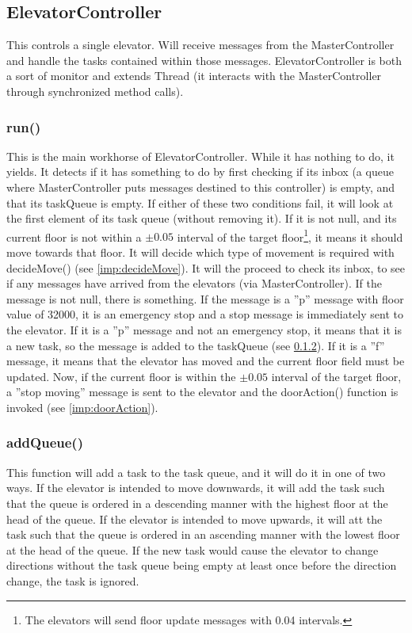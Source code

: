 \subsection{ElevatorController}
This controls a single elevator. Will receive messages from the MasterController and handle the tasks contained within those messages. ElevatorController is both a sort of monitor and extends Thread (it interacts with the MasterController through synchronized method calls).

\subsubsection{run()}
\label{imp:elerun}
This is the main workhorse of ElevatorController. While it has nothing to do, it yields. It detects if it has something to do by first checking if its inbox (a queue where MasterController puts messages destined to this controller) is empty, and that its taskQueue is empty.\newline
If either of these two conditions fail, it will look at the first element of its task queue (without removing it). If it is not null, and its current floor is not within a $\pm 0.05$ interval of the target floor\footnote{The elevators will send floor update messages with 0.04 intervals.}, it means it should move towards that floor. It will decide which type of movement is required with decideMove() (see \cref{imp:decideMove}). \newline
It will the proceed to check its inbox, to see if any messages have arrived from the elevators (via MasterController). If the message is not null, there is something. If the message is a ''p'' message with floor value of 32000, it is an emergency stop and a stop message is immediately sent to the elevator.\newline
If it is a ''p'' message and not an emergency stop, it means that it is a new task, so the message is added to the taskQueue (see \cref{imp:addtask}).\newline
If it is a ''f'' message, it means that the elevator has moved and the current floor field must be updated. Now, if the current floor is within the $\pm0.05$ interval of the target floor, a ''stop moving'' message is sent to the elevator and the doorAction() function is invoked (see \cref{imp:doorAction}).

\subsubsection{addQueue()}
\label{imp:addtask}
This function will add a task to the task queue, and it will do it in one of two ways.
If the elevator is intended to move downwards, it will add the task such that the queue is ordered in a descending manner with the highest floor at the head of the queue.\newline
If the elevator is intended to move upwards, it will att the task such that the queue is ordered in an ascending manner with the lowest floor at the head of the queue.
\newline
If the new task would cause the elevator to change directions without the task queue being empty at least once before the direction change, the task is ignored.

